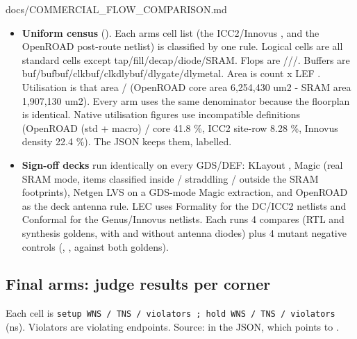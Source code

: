 \begin{relocated}{docs/COMMERCIAL_FLOW_COMPARISON.md}
\begin{itemize}
  compare.py checks the  recorded in every judge run
  against these files. All runs agree (JSON  is empty).
  OpenROAD has no own variant: it writes no SDC of its own, and its
  native STA uses the base file.
\item
  \textbf{Uniform census} (). Each arm\textquotesingle s
  cell list (the ICC2/\allowbreak{}Innovus , and
  the OpenROAD post-route netlist) is classified by one rule. Logical
  cells are all standard cells except
  tap/\allowbreak{}fill/\allowbreak{}decap/\allowbreak{}diode/\allowbreak{}SRAM.
  Flops are ///. Buffers
  are
  buf/\allowbreak{}bufbuf/\allowbreak{}clkbuf/\allowbreak{}clkdlybuf/\allowbreak{}dlygate/\allowbreak{}dlymetal.
  Area is count x LEF . Utilisation is that area / (OpenROAD
  core area 6,254,430 um2 - SRAM area 1,907,130 um2). Every arm uses the
  same denominator because the floorplan is identical. Native
  utilisation figures use incompatible definitions (OpenROAD (std +
  macro) / core 41.8 \%, ICC2 site-row 8.28 \%, Innovus density 22.4
  \%). The JSON keeps them, labelled.
\item
  \textbf{Sign-off decks} run identically on every GDS/DEF: KLayout
  , Magic (real SRAM mode, items classified inside
  / straddling / outside the SRAM footprints), Netgen LVS on a GDS-mode
  Magic extraction, and OpenROAD  as the deck
  antenna rule. LEC uses Formality for the DC/ICC2 netlists and
  Conformal for the Genus/\allowbreak{}Innovus netlists. Each runs 4
  compares (RTL and synthesis goldens, with and without antenna diodes)
  plus 4 mutant negative controls (, , against
  both goldens).
\end{itemize}

\subsection{Final arms: judge results per corner}\label{tm:pd:commercial-flow-comparison:4-final-arms-judge-results-per-corner}

Each cell is
\texttt{setup\ WNS\ /\allowbreak{}\ TNS\ /\allowbreak{}\ violators\ ;\ hold\ WNS\ /\allowbreak{}\ TNS\ /\allowbreak{}\ violators}
(ns). Violators are violating endpoints. Source:
 in the JSON, which points
to .


\end{relocated}
